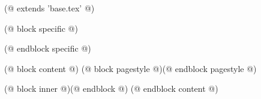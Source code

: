 (@ extends 'base.tex' @)

(@ block specific @)
    
(@ endblock specific @)
 
(@ block content @)
    (@ block pagestyle @)(@ endblock pagestyle @)
    \thispagestyle{seminar-first-(* competition.id *)-(* volume.id *)-(* semester.id *)}
    
    \afterpage{\aftergroup\restoregeometry}

    (@ block inner @)(@ endblock @)
(@ endblock content @)
